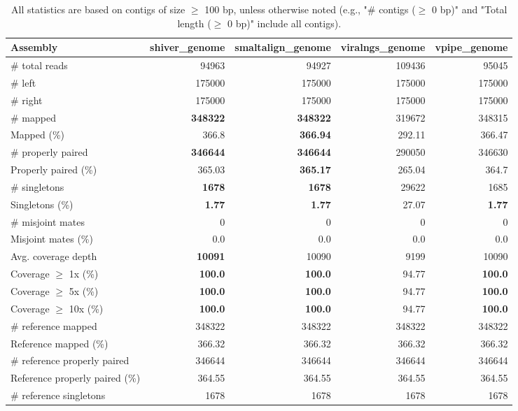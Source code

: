 \documentclass[12pt,a4paper]{article}
\begin{document}
\begin{table}[ht]
\begin{center}
\caption{All statistics are based on contigs of size $\geq$ 100 bp, unless otherwise noted (e.g., "\# contigs ($\geq$ 0 bp)" and "Total length ($\geq$ 0 bp)" include all contigs).}
\begin{tabular}{|l*{4}{|r}|}
\hline
Assembly & shiver\_genome & smaltalign\_genome & viralngs\_genome & vpipe\_genome \\ \hline
\# total reads & 94963 & 94927 & 109436 & 95045 \\ \hline
\# left & 175000 & 175000 & 175000 & 175000 \\ \hline
\# right & 175000 & 175000 & 175000 & 175000 \\ \hline
\# mapped & {\bf 348322} & {\bf 348322} & 319672 & 348315 \\ \hline
Mapped (\%) & 366.8 & {\bf 366.94} & 292.11 & 366.47 \\ \hline
\# properly paired & {\bf 346644} & {\bf 346644} & 290050 & 346630 \\ \hline
Properly paired (\%) & 365.03 & {\bf 365.17} & 265.04 & 364.7 \\ \hline
\# singletons & {\bf 1678} & {\bf 1678} & 29622 & 1685 \\ \hline
Singletons (\%) & {\bf 1.77} & {\bf 1.77} & 27.07 & {\bf 1.77} \\ \hline
\# misjoint mates & 0 & 0 & 0 & 0 \\ \hline
Misjoint mates (\%) & 0.0 & 0.0 & 0.0 & 0.0 \\ \hline
Avg. coverage depth & {\bf 10091} & 10090 & 9199 & 10090 \\ \hline
Coverage $\geq$ 1x (\%) & {\bf 100.0} & {\bf 100.0} & 94.77 & {\bf 100.0} \\ \hline
Coverage $\geq$ 5x (\%) & {\bf 100.0} & {\bf 100.0} & 94.77 & {\bf 100.0} \\ \hline
Coverage $\geq$ 10x (\%) & {\bf 100.0} & {\bf 100.0} & 94.77 & {\bf 100.0} \\ \hline
\# reference mapped & 348322 & 348322 & 348322 & 348322 \\ \hline
Reference mapped (\%) & 366.32 & 366.32 & 366.32 & 366.32 \\ \hline
\# reference properly paired & 346644 & 346644 & 346644 & 346644 \\ \hline
Reference properly paired (\%) & 364.55 & 364.55 & 364.55 & 364.55 \\ \hline
\# reference singletons & 1678 & 1678 & 1678 & 1678 \\ \hline

\end{tabular}
\end{center}
\end{table}
\end{document}
